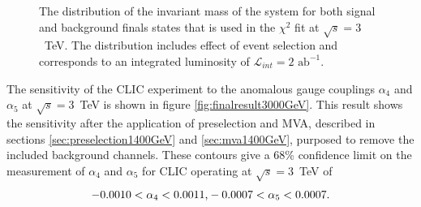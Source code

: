 \begin{figure}[h!]
\centering
{}
\caption[The distribution of the invariant mass of the system for both signal and background finals states that is used in the $\chi^{2}$ fit at $\sqrt{s}=3$~TeV.  The distribution includes effect of event selection and corresponds to an integrated luminosity of $\mathcal{L}_{int} = 2\text{ ab}^{-1}$.]{The distribution of the invariant mass of the system for both signal and background finals states that is used in the $\chi^{2}$ fit at $\sqrt{s}=3$~TeV.  The distribution includes effect of event selection and corresponds to an integrated luminosity of $\mathcal{L}_{int} = 2\text{ ab}^{-1}$.}
\label{fig:signalbackgroundfit3000}
\end{figure}

The sensitivity of the CLIC experiment to the anomalous gauge couplings $\alpha_{4}$ and $\alpha_{5}$ at $\sqrt{s}=3$~TeV is shown in figure \ref{fig:finalresult3000GeV}.  This result shows the sensitivity after the application of preselection and MVA, described in sections \ref{sec:preselection1400GeV} and \ref{sec:mva1400GeV}, purposed to remove the included background channels.  These contours give a 68\% confidence limit on the measurement of $\alpha_{4}$ and $\alpha_{5}$ for CLIC operating at $\sqrt{s}=3$~TeV of
%
\begin{equation}
-0.0010 < \alpha_{4} < 0.0011 \text{,} \\
-0.0007 < \alpha_{5} < 0.0007 \text{.}
\end{equation}
%

